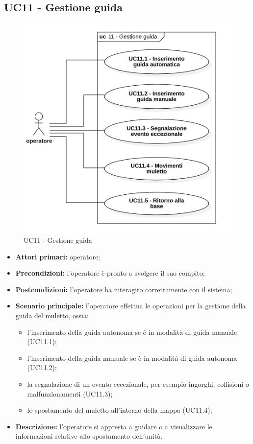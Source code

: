 \subsection{UC11 - Gestione guida}

\begin{figure}[H]
	\centering
	\includegraphics[scale=0.52]{res/images/uc11.png}
	\caption{ UC11 - Gestione guida}
\end{figure}

\begin{itemize}
	\item 	\textbf{Attori primari:} operatore;
	\item 	\textbf{Precondizioni:} l'operatore è pronto a svolgere il suo compito;
	\item 	\textbf{Postcondizioni:} l'operatore ha interagito correttamente con il sistema; 
	\item 	\textbf{Scenario principale:} l'operatore effettua le operazioni per la gestione della guida del muletto, ossia:
	\begin{itemize}
		\item l'inserimento della guida autonoma se è in modalità di guida manuale (UC11.1);
		\item l'inserimento della guida manuale se è in modalità di guida autonoma (UC11.2);
		\item la segnalazione di un evento eccezionale, per esempio ingorghi, collisioni o malfunzionamenti (UC11.3);
		\item lo spostamento del muletto all'interno della mappa (UC11.4);
	\end{itemize}
	\item 	\textbf{Descrizione:} l'operatore si appresta a guidare o a visualizzare le informazioni relative allo spostamento dell'unità. 

\end{itemize}

